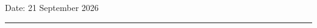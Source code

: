 \documentclass[11pt,oneside]{book}
\renewcommand{\chaptermark}[1]{\markboth{\chaptername\ \thechapter. #1}{}}
\begin{document}
\noindent Date: 21 September 2026\\[1mm]
\rule[1em]{25em}{0.5pt}





\tableofcontents
\listoffigures
\listoftables


\mainmatter





\begin{appendices}
\renewcommand{\chaptermark}[1]{\markboth{\appendixname\ \thechapter. #1}{}}
\end{appendices}
\end{document}
